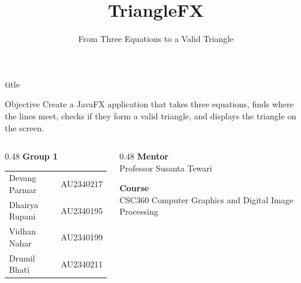 \documentclass[aspectratio=169,11pt]{beamer}
\title[TriangleFX]{TriangleFX}
\subtitle{From Three Equations to a Valid Triangle}
\author[CSC360 Group 1]{}
\institute[]{}
\date{}
\begin{document}
\begin{frame}[plain]

    \begin{beamercolorbox}[
        wd=\paperwidth,
        sep=10pt,
        center
    ]{title}
        {\inserttitle\par}
        \vspace{4pt}
        {\insertsubtitle\par}
    \end{beamercolorbox}

    \vspace{0.45cm}

    \begin{block}{Objective}
        \small
        Create a JavaFX application that takes three equations, finds where the lines meet, checks if they form a valid triangle, and displays the triangle on the screen.
    \end{block}

    \vfill

    \begin{columns}[T]

        \begin{column}{0.48\textwidth}
            \textbf{Group 1}

            \vspace{0.15cm}

            \begin{tabular}{ll}
                Devang Parmar  & AU2340217 \\
                Dhairya Rupani & AU2340195 \\
                Vidhan Nahar   & AU2340199 \\
                Drumil Bhati   & AU2340211
            \end{tabular}
        \end{column}

        \begin{column}{0.48\textwidth}
            \raggedleft
            \textbf{Mentor}\\
            Professor Susanta Tewari

            \vspace{0.25cm}

            \textbf{Course}\\
            CSC360 Computer Graphics and Digital Image Processing
        \end{column}

    \end{columns}

\end{frame}
\end{document}
